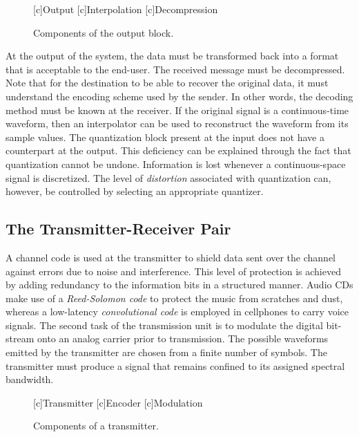 \begin{figure}[htbp]
\begin{center}
\begin{psfrags}
[c]{Output}
[c]{Interpolation}
[c]{Decompression}
\end{psfrags}
\end{center}
\caption{Components of the output block.}
\label{figure:BlockOutput}
\end{figure}

At the output of the system, the data must be transformed back into a format that is acceptable to the end-user.
The received message must be decompressed.
Note that for the destination to be able to recover the original data, it must understand the encoding scheme used by the sender.
In other words, the decoding method must be known at the receiver.
If the original signal is a continuous-time waveform, then an interpolator can be used to reconstruct the waveform from its sample values.
The quantization block present at the input does not have a counterpart at the output.
This deficiency can be explained through the fact that quantization cannot be undone.
Information is lost whenever a continuous-space signal is discretized.
The level of \emph{distortion} associated with quantization can, however, be controlled by selecting an appropriate quantizer.


\subsection{The Transmitter-Receiver Pair}

A channel code is used at the transmitter to shield data sent over the channel against errors due to noise and interference.
This level of protection is achieved by adding redundancy to the information bits in a structured manner.
Audio CDs make use of a \emph{Reed-Solomon code} to protect the music from scratches and dust, whereas a low-latency \emph{convolutional code} is employed in cellphones to carry voice signals.
The second task of the transmission unit is to modulate the digital bit-stream onto an analog carrier prior to transmission.
The possible waveforms emitted by the transmitter are chosen from a finite number of symbols.
The transmitter must produce a signal that remains confined to its assigned spectral bandwidth.

\begin{figure}[htbp]
\begin{center}
\begin{psfrags}
[c]{Transmitter}
[c]{Encoder}
[c]{Modulation}
\end{psfrags}
\end{center}
\caption{Components of a transmitter.}
\label{figure:BlockTransmitter}
\end{figure}

